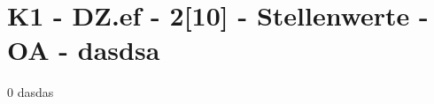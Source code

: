 \section{K1 - DZ.ef - 2[10] - Stellenwerte - OA - dasdsa}

\begin{langesbeispiel}\item[0] %
dasdas

\end{langesbeispiel}